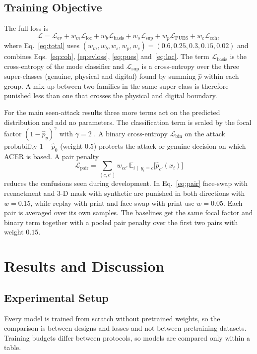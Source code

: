 \documentclass[conference]{IEEEtran}
\newcommand{\sub}[1]{\subsection{\texorpdfstring{\textbf{#1}}{#1}}}
\begin{document}
\sub{Training Objective}
The full loss is
\begin{equation}
\mathcal{L} = \mathcal{L}_{\text{ev}} + w_{m}\mathcal{L}_{\text{loc}}
+ w_{b}\mathcal{L}_{\text{basis}} + w_{s}\mathcal{L}_{\text{sup}}
+ w_{p}\mathcal{L}_{\text{PUES}} + w_{c}\mathcal{L}_{\text{coh}},
\label{eq:total}
\end{equation}
where Eq.~\eqref{eq:total} uses
$(w_{m},w_{b},w_{s},w_{p},w_{c})=(0.6,0.25,0.3,0.15,0.02)$ and combines
Eqs.~\eqref{eq:coh}, \eqref{eq:evloss}, \eqref{eq:pues} and~\eqref{eq:loc}. The term
$\mathcal{L}_{\text{basis}}$ is the cross-entropy of the mode classifier and
$\mathcal{L}_{\text{sup}}$ is a cross-entropy over the three super-classes (genuine,
physical and digital) found by summing $\hat{p}$ within each group. A mix-up between
two families in the same super-class is therefore punished less than one that
crosses the physical and digital boundary.

For the main seen-attack results three more terms act on the predicted distribution
and add no parameters. The classification term is scaled by the focal factor
$(1-\hat{p}_{y})^{\gamma}$ with $\gamma=2$ \cite{lin2017focal}. A binary cross-entropy
$\mathcal{L}_{\text{bin}}$ on the attack probability $1-\hat{p}_{0}$ (weight $0.5$)
protects the attack or genuine decision on which ACER is based. A pair penalty
\begin{equation}
\mathcal{L}_{\text{pair}} = \sum_{(c,c')} w_{cc'}\,
\mathbb{E}_{i\,\mid\,y_i=c}\bigl[\hat{p}_{c'}(x_i)\bigr]
\label{eq:pair}
\end{equation}
reduces the confusions seen during development. In Eq.~\eqref{eq:pair} face-swap with
reenactment and 3-D mask with synthetic are punished in both directions with
$w=0.15$, while replay with print and face-swap with print use $w=0.05$. Each pair is
averaged over its own samples. The baselines get the same focal factor and binary
term together with a pooled pair penalty over the first two pairs with weight $0.15$.

\section{Results and Discussion}\label{sec:exp}

\sub{Experimental Setup}
Every model is trained from scratch without pretrained weights, so the comparison is
between designs and losses and not between pretraining datasets. Training budgets
differ between protocols, so models are compared only within a table.
\end{document}
